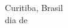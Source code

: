 \begin{agradecimentos}







\ \\
\ \\

\noindent

\raggedright
Curitiba, Brasil \\ 
dia de \mesdeano \\

\raggedleft
\theauthor\\ \theauthorr\\ \theauthorrr\\ \theauthorrrr\\

\end{agradecimentos}
